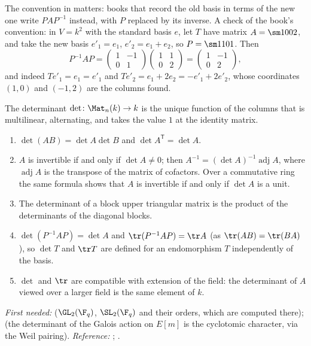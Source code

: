 The convention in  matters: books that record the old basis in terms of
the new one write $PAP^{-1}$ instead, with $P$ replaced by its inverse. A check of the book's
convention: in $V=k^2$ with the standard basis $e$, let $T$ have matrix $A=\sm1002$, and take the
new basis $e'_1=e_1$, $e'_2=e_1+e_2$, so $P=\sm1101$. Then
\[
P^{-1}AP=\begin{pmatrix}1&-1\\0&1\end{pmatrix}\begin{pmatrix}1&1\\0&2\end{pmatrix}
=\begin{pmatrix}1&-1\\0&2\end{pmatrix},
\]
and indeed $Te'_1=e_1=e'_1$ and $Te'_2=e_1+2e_2=-e'_1+2e'_2$, whose coordinates $(1,0)$ and
$(-1,2)$ are the columns found.

\begin{theorem}\label{thm:prereq:det}
The determinant $\det\colon\Mat_n(k)\to k$ is the unique function of the columns that is
multilinear, alternating, and takes the value $1$ at the identity matrix.
\begin{enumerate}[label=(\alph*)]
\item $\det(AB)=\det A\det B$ and $\det A^{\mathsf T}=\det A$.
\item $A$ is invertible if and only if $\det A\ne0$; then $A^{-1}=(\det A)^{-1}\operatorname{adj}A$,
where $\operatorname{adj}A$ is the transpose of the matrix of cofactors. Over a commutative ring the
same formula shows that $A$ is invertible if and only if $\det A$ is a unit.
\item The determinant of a block upper triangular matrix is the product of the determinants of
the diagonal blocks.
\item $\det(P^{-1}AP)=\det A$ and $\tr(P^{-1}AP)=\tr A$ (as $\tr(AB)=\tr(BA)$), so $\det T$ and
$\tr T$ are defined for an endomorphism $T$ independently of the basis.
\item $\det$ and $\tr$ are compatible with extension of the field: the determinant of $A$ viewed
over a larger field is the same element of $k$.
\end{enumerate}
\end{theorem}
\noindent\emph{First needed:}  ($\GL_2(\F_q)$, $\SL_2(\F_q)$ and their orders,
which are computed there);  (the determinant of the Galois action on $E[m]$ is
the cyclotomic character, via the Weil pairing). \emph{Reference:} \cite[Chapter 10]{Axler15};
\cite[Chapter XIII]{Lang}.

